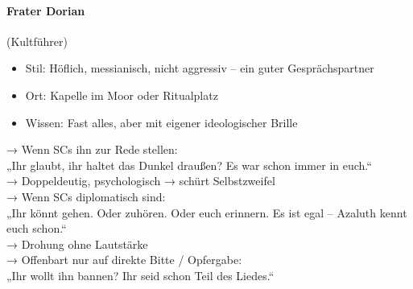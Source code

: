 \paragraph{Frater Dorian} (Kultführer)
\begin{itemize}
\item Stil: Höflich, messianisch, nicht aggressiv – ein guter Gesprächspartner
\item Ort: Kapelle im Moor oder Ritualplatz
\item Wissen: Fast alles, aber mit eigener ideologischer Brille
\end{itemize}
→ Wenn SCs ihn zur Rede stellen:\\
„Ihr glaubt, ihr haltet das Dunkel draußen? Es war schon immer in euch.“\\
→ Doppeldeutig, psychologisch → schürt Selbstzweifel\\
→ Wenn SCs diplomatisch sind:\\
„Ihr könnt gehen. Oder zuhören. Oder euch erinnern. Es ist egal – Azaluth kennt euch schon.“\\
→ Drohung ohne Lautstärke\\
→ Offenbart nur auf direkte Bitte / Opfergabe:\\
„Ihr wollt ihn bannen? Ihr seid schon Teil des Liedes.“